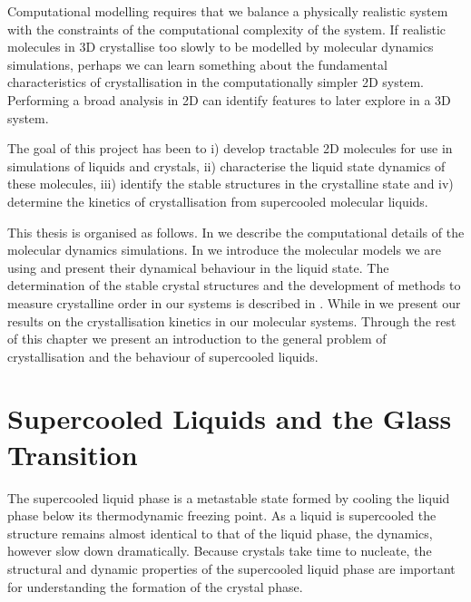 Computational modelling requires that we balance a physically realistic system with the constraints of the computational complexity of the system. If realistic molecules in 3D crystallise too slowly to be modelled by molecular dynamics simulations, perhaps we can learn something about the fundamental characteristics of crystallisation in the computationally simpler 2D system. Performing a broad analysis in 2D can identify features to later explore in a 3D system.

The goal of this project has been to i) develop tractable 2D molecules for use in simulations of liquids and crystals, ii) characterise the liquid state dynamics of these molecules, iii) identify the stable structures in the crystalline state and iv) determine the kinetics of crystallisation from supercooled molecular liquids.

This thesis is organised as follows. In  we describe the computational details of the molecular dynamics simulations. In  we introduce the molecular models we are using and present their dynamical behaviour in the liquid state. The determination of the stable crystal structures and the development of methods to measure crystalline order in our systems is described in . While in  we present our results on the crystallisation kinetics in our molecular systems. Through the rest of this chapter we present an introduction to the general problem of crystallisation and the behaviour of supercooled liquids.

\section{Supercooled Liquids and the Glass Transition}

The supercooled liquid phase is a metastable state formed by cooling the liquid phase below its thermodynamic freezing point. As a liquid is supercooled the structure remains almost identical to that of the liquid phase, the dynamics, however slow down dramatically. Because crystals take time to nucleate, the structural and dynamic properties of the supercooled liquid phase are important for understanding the formation of the crystal phase.

